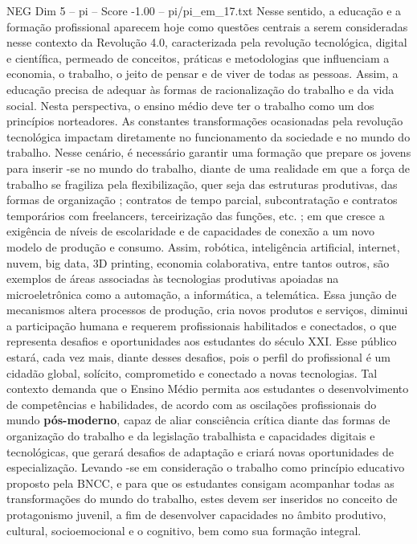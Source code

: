 \begin{textsample}{NEG Dim 5 – pi – Score -1.00 – pi/pi\_em\_17.txt}
Nesse sentido, a educação e a formação profissional aparecem hoje como questões centrais a serem consideradas nesse contexto da Revolução 4.0, caracterizada pela revolução tecnológica, digital e científica, permeado de conceitos, práticas e metodologias que influenciam a economia, o trabalho, o jeito de pensar e de viver de todas as pessoas.
Assim, a educação precisa de adequar às formas de racionalização do trabalho e da vida social.
Nesta perspectiva, o ensino médio deve ter o trabalho como um dos princípios norteadores.
As constantes transformações ocasionadas pela revolução tecnológica impactam diretamente no funcionamento da sociedade e no mundo do trabalho.
Nesse cenário, é necessário garantir uma formação que prepare os jovens para inserir -se no mundo do trabalho, diante de uma realidade em que a força de trabalho se fragiliza pela flexibilização, quer seja das estruturas produtivas, das formas de organização ; contratos de tempo parcial, subcontratação e contratos temporários com freelancers, terceirização das funções, etc. ; em que cresce a exigência de níveis de escolaridade e de capacidades de conexão a um novo modelo de produção e consumo.
Assim, robótica, inteligência artificial, internet, nuvem, big data, 3D printing, economia colaborativa, entre tantos outros, são exemplos de áreas associadas às tecnologias produtivas apoiadas na microeletrônica como a automação, a informática, a telemática.
Essa junção de mecanismos altera processos de produção, cria novos produtos e serviços, diminui a participação humana e requerem profissionais habilitados e conectados, o que representa desafios e oportunidades aos estudantes do século XXI.
Esse público estará, cada vez mais, diante desses desafios, pois o perfil do profissional é um cidadão global, solícito, comprometido e conectado a novas tecnologias.
Tal contexto demanda que o Ensino Médio permita aos estudantes o desenvolvimento de competências e habilidades, de acordo com as oscilações profissionais do mundo \textbf{pós-moderno}, capaz de aliar consciência crítica diante das formas de organização do trabalho e da legislação trabalhista e capacidades digitais e tecnológicas, que gerará desafios de adaptação e criará novas oportunidades de especialização.
Levando -se em consideração o trabalho como princípio educativo proposto pela BNCC, e para que os estudantes consigam acompanhar todas as transformações do mundo do trabalho, estes devem ser inseridos no conceito de protagonismo juvenil, a fim de desenvolver capacidades no âmbito produtivo, cultural, socioemocional e o cognitivo, bem como sua formação integral.

\end{textsample}
